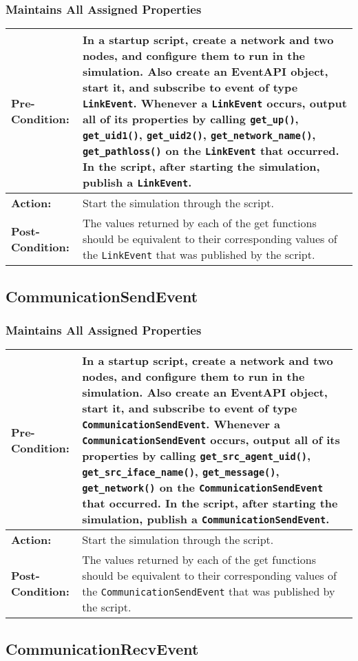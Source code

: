 \documentclass[titlepage]{article}
\newcommand{\testcase}[3]{
    \begin{center}
    \begin{tabular}{| l | p{0.7\textwidth}|}
        \hline
        \rowcolor[gray]{0.8}\textbf{Pre-Condition:} & #1 \\ \hline
        \textbf{Action:} & #2 \\ \hline
        \rowcolor[gray]{0.8}\textbf{Post-Condition:} & #3 \\ \hline
    \end{tabular}
    \end{center}
}
\begin{document}
\subsubsection{Maintains All Assigned Properties}
\testcase{In a startup script, create a network and two nodes, and configure them to run in the simulation. Also create an EventAPI object, start it, and subscribe to event of type \texttt{LinkEvent}. Whenever a \texttt{LinkEvent} occurs, output all of its properties by calling \texttt{get\_up()}, \texttt{get\_uid1()}, \texttt{get\_uid2()}, \texttt{get\_network\_name()}, \texttt{get\_pathloss()} on the \texttt{LinkEvent} that occurred. In the script, after starting the simulation, publish a \texttt{LinkEvent}.}{Start the simulation through the script.}{The values returned by each of the get functions should be equivalent to their corresponding values of the \texttt{LinkEvent} that was published by the script.}

\subsection{CommunicationSendEvent}
\subsubsection{Maintains All Assigned Properties}
\testcase{In a startup script, create a network and two nodes, and configure them to run in the simulation. Also create an EventAPI object, start it, and subscribe to event of type \texttt{CommunicationSendEvent}. Whenever a \texttt{CommunicationSendEvent} occurs, output all of its properties by calling \texttt{get\_src\_agent\_uid()}, \texttt{get\_src\_iface\_name()}, \texttt{get\_message()}, \texttt{get\_network()} on the \texttt{CommunicationSendEvent} that occurred. In the script, after starting the simulation, publish a \texttt{CommunicationSendEvent}.}{Start the simulation through the script.}{The values returned by each of the get functions should be equivalent to their corresponding values of the \texttt{CommunicationSendEvent} that was published by the script.}

\subsection{CommunicationRecvEvent}
\end{document}
